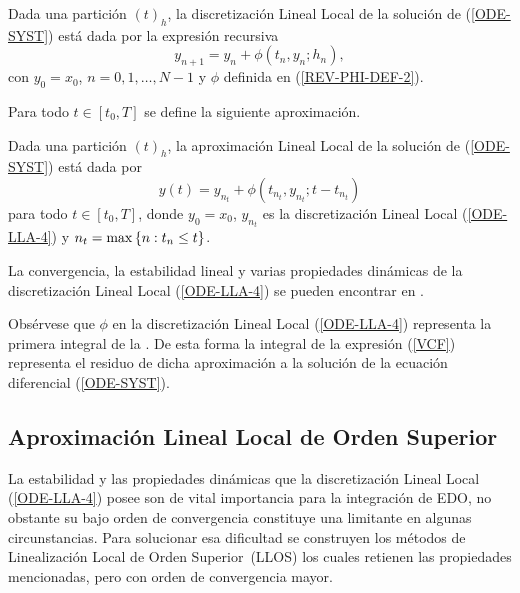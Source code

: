 \begin{definition}
	\label{definition LLD} Dada una partición $(t)_{h}$, la discretización Lineal Local de la solución de (\ref{ODE-SYST}) está dada por la expresión recursiva
	\begin{equation}
	y_{n+1}=y_{n}+\phi \left( t_{n},y_{n};h_{n}\right) ,  \label{ODE-LLA-4}
	\end{equation}%
	con $y_{0}=x_{0}$, $n=0,1,\ldots,N-1$ y $\phi$ definida en (\ref{REV-PHI-DEF-2}).
\end{definition}

Para todo $t\in[t_{0},T]$ se define la siguiente aproximación.
\begin{definition}
	\label{definition LLA} Dada una partición $(t)_{h}$, la aproximación
	Lineal Local de la solución de (\ref{ODE-SYST}) está dada por 
	\begin{equation}
	y(t)=y_{n_{t}}+\phi(t_{n_{t}},y_{n_{t}};t-t_{n_{t}})
	\label{ODE-REV-FORM-LLA}
	\end{equation}
	para todo $t\in[t_{0},T]$, donde $y_{0}=x_{0}$, $y_{n_{t}}$ es la discretización Lineal Local (\ref{ODE-LLA-4}) y ${n_{t}=\max\left\{ n:t_{n}\leq t \right\}}$.
\end{definition}

 La convergencia, la estabilidad lineal y varias propiedades dinámicas de  la discretización Lineal Local (\ref{ODE-LLA-4}) se pueden encontrar en \cite{Jimenez02AMC}. 
 
 Obsérvese que $\phi$ en la discretización Lineal Local (\ref{ODE-LLA-4}) representa la primera integral de la . De esta forma la integral de la expresión (\ref{VCF}) representa el residuo de dicha aproximación a la solución de la ecuación diferencial (\ref{ODE-SYST}).
\subsection{Aproximación Lineal Local de Orden Superior}

La estabilidad y las propiedades dinámicas que la discretización Lineal Local (\ref{ODE-LLA-4}) posee son de vital importancia para la integración de EDO, no obstante su bajo orden de convergencia constituye una limitante en algunas circunstancias. Para solucionar esa dificultad se construyen los métodos de Linealización Local de Orden Superior~(LLOS) los cuales retienen las propiedades mencionadas, pero con orden de convergencia mayor. 

